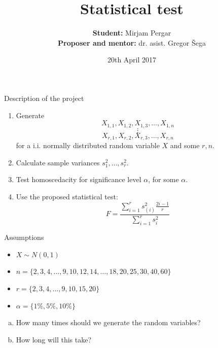 \documentclass{beamer}
\title[Statistical test]
{Statistical test}
\author[Mirjam Pergar]
{\textbf{Student:}  Mirjam Pergar\\
\textbf{Proposer and mentor:} dr. asist. Gregor Šega
}
\institute[Fakuleta za matematiko in fiziko]
\date[20th April 2017] %
{20th April 2017}
\begin{document}
\begin{frame}
\titlepage
\end{frame}

\begin{frame}{Description of the project}
\begin{enumerate}
\item Generate 
$$X_{1,1}, X_{1,2},X_{1,3}, \dots , X_{1,n}$$
$$\vdots$$
$$X_{r,1}, X_{r,2}, X_{r,3}, \dots, X_{r,n}$$
for a i.i. normally distributed random variable $X$ and some $r, n$.
\item Calculate sample variances $s^2_{1}, \dots, s^2_{r}$.
\item Test homoscedacity for significance level $\alpha$, for some $\alpha$.
\item Use the proposed statistical test: $$F =\frac{ \sum_{i=1}^{r} s^2_{(i)} \frac{2i-1}{r}}{\sum_{i=1}^{r} s^2_{i}}$$
\end{enumerate}
\end{frame}

\begin{frame}{Assumptions}
\begin{itemize}
\item $X \sim N(0,1)$
\item $n = \{2,3,4,\dots, 9,10,12,14,\dots, 18,20,25,30,40,60\}$
\item $r = \{2,3,4, \dots ,9,10,15,20\}$
\item $\alpha = \{1\%,5\%,10\%\}$
\end{itemize}
\pause
\begin{enumerate}[(a)]
\item How many times should we generate the random variables?
\item How long will this take?
\end{enumerate}

\end{frame}
\end{document}
